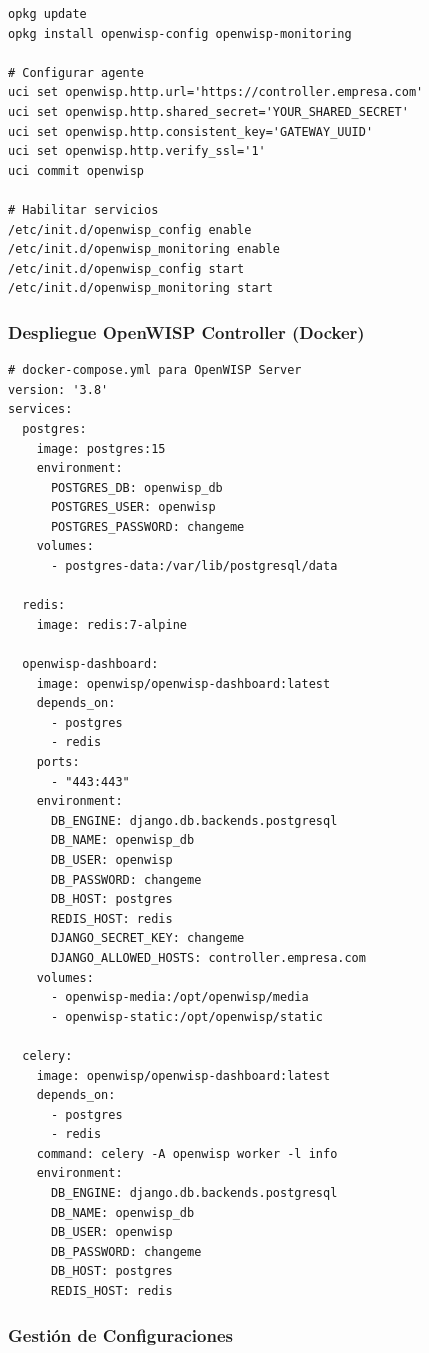 \begin{verbatim}
opkg update
opkg install openwisp-config openwisp-monitoring

# Configurar agente
uci set openwisp.http.url='https://controller.empresa.com'
uci set openwisp.http.shared_secret='YOUR_SHARED_SECRET'
uci set openwisp.http.consistent_key='GATEWAY_UUID'
uci set openwisp.http.verify_ssl='1'
uci commit openwisp

# Habilitar servicios
/etc/init.d/openwisp_config enable
/etc/init.d/openwisp_monitoring enable
/etc/init.d/openwisp_config start
/etc/init.d/openwisp_monitoring start
\end{verbatim}

\subsubsection{Despliegue OpenWISP Controller (Docker)}

\begin{verbatim}
# docker-compose.yml para OpenWISP Server
version: '3.8'
services:
  postgres:
    image: postgres:15
    environment:
      POSTGRES_DB: openwisp_db
      POSTGRES_USER: openwisp
      POSTGRES_PASSWORD: changeme
    volumes:
      - postgres-data:/var/lib/postgresql/data

  redis:
    image: redis:7-alpine

  openwisp-dashboard:
    image: openwisp/openwisp-dashboard:latest
    depends_on:
      - postgres
      - redis
    ports:
      - "443:443"
    environment:
      DB_ENGINE: django.db.backends.postgresql
      DB_NAME: openwisp_db
      DB_USER: openwisp
      DB_PASSWORD: changeme
      DB_HOST: postgres
      REDIS_HOST: redis
      DJANGO_SECRET_KEY: changeme
      DJANGO_ALLOWED_HOSTS: controller.empresa.com
    volumes:
      - openwisp-media:/opt/openwisp/media
      - openwisp-static:/opt/openwisp/static

  celery:
    image: openwisp/openwisp-dashboard:latest
    depends_on:
      - postgres
      - redis
    command: celery -A openwisp worker -l info
    environment:
      DB_ENGINE: django.db.backends.postgresql
      DB_NAME: openwisp_db
      DB_USER: openwisp
      DB_PASSWORD: changeme
      DB_HOST: postgres
      REDIS_HOST: redis
\end{verbatim}

\subsubsection{Gestión de Configuraciones}

